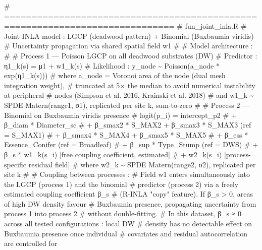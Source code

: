 \documentclass[
  letterpaper,
  DIV=11,
  numbers=noendperiod]{scrartcl}
\newenvironment{Shaded}{\begin{snugshade}}{\end{snugshade}}
\newcommand{\CommentTok}[1]{\textcolor[rgb]{0.37,0.37,0.37}{#1}}
\begin{document}
\begin{Shaded}
\begin{Highlighting}[]
\CommentTok{\# =============================================================================}
\CommentTok{\# fun\_joint\_inla.R}
\CommentTok{\# Joint INLA model : LGCP (deadwood pattern) + Binomial (Buxbaumia viridis)}
\CommentTok{\# Uncertainty propagation via shared spatial field w1}
\CommentTok{\#}
\CommentTok{\# Model architecture :}
\CommentTok{\#}
\CommentTok{\#   Process 1 — Poisson LGCP on all deadwood substrates (DW)}
\CommentTok{\#     Predictor  : η1\_k(s) = μ1 + w1\_k(s)}
\CommentTok{\#     Likelihood : y\_node \textasciitilde{} Poisson(a\_node * exp(η1\_k(s)))}
\CommentTok{\#     where a\_node = Voronoi area of the node (dual mesh integration weight),}
\CommentTok{\#     truncated at 5× the median to avoid numerical instability at peripheral}
\CommentTok{\#     nodes (Simpson et al. 2016, Krainski et al. 2018)}
\CommentTok{\#     and w1\_k \textasciitilde{} SPDE Matern(range1, σ1), replicated per site k, sum{-}to{-}zero}
\CommentTok{\#}
\CommentTok{\#   Process 2 — Binomial on Buxbaumia viridis presence}
\CommentTok{\#     logit(p\_i) = intercept\_p2}
\CommentTok{\#                + β\_diam  * Diameter\_sc}
\CommentTok{\#                + β\_smax2 * S\_MAX2 + β\_smax3 * S\_MAX3  (ref = S\_MAX1)}
\CommentTok{\#                + β\_smax4 * S\_MAX4 + β\_smax5 * S\_MAX5}
\CommentTok{\#                + β\_ess   * Essence\_Conifer             (ref = Broadleaf)}
\CommentTok{\#                + β\_sup   * Type\_Stump                  (ref = DWS)}
\CommentTok{\#                + β\_s     * w1\_k(s\_i)   [free coupling coefficient, estimated]}
\CommentTok{\#                + w2\_k(s\_i)              [process{-}specific residual field]}
\CommentTok{\#     where w2\_k \textasciitilde{} SPDE Matern(range2, σ2), replicated per site k}
\CommentTok{\#}
\CommentTok{\# Coupling between processes :}
\CommentTok{\#   Field w1 enters simultaneously into the LGCP (process 1) and the binomial}
\CommentTok{\#   predictor (process 2) via a freely estimated coupling coefficient β\_s}
\CommentTok{\#   (R{-}INLA "copy" feature). If β\_s \textgreater{} 0, areas of high DW density favour}
\CommentTok{\#   Buxbaumia presence, propagating uncertainty from process 1 into process 2}
\CommentTok{\#   without double{-}fitting.}
\CommentTok{\#   In this dataset, β\_s ≈ 0 across all tested configurations : local DW}
\CommentTok{\#   density has no detectable effect on Buxbaumia presence once individual}
\CommentTok{\#   covariates and residual autocorrelation are controlled for}

\end{Highlighting}
\end{Shaded}
\end{document}
